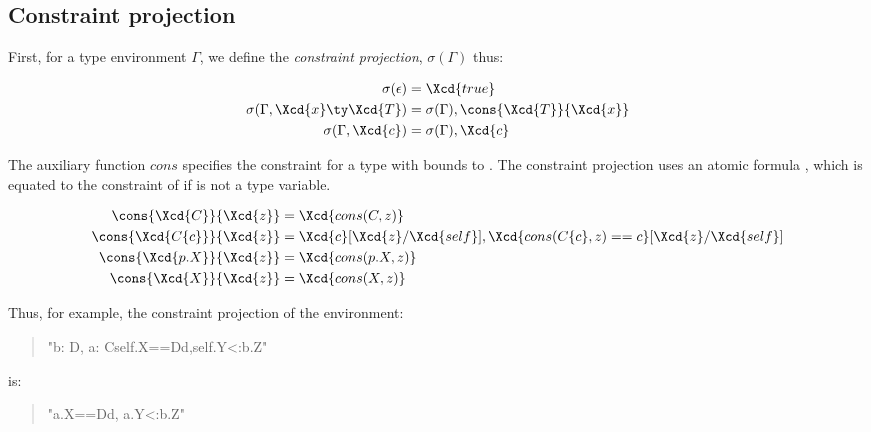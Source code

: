 \subsection{
Constraint projection
}

First, for a type environment $\Gamma$,
we define the \emph{constraint projection},
$\sigma(\Gamma)$ thus:

\begin{align*}
\sigma(\epsilon) &= \Xcd{true} \\
\sigma(\Gamma, \Xcd{x} \ty \Xcd{T}) &=
        \sigma(\Gamma),
        \cons{\Xcd{T}}{\Xcd{x}}
\\
\sigma(\Gamma, \Xcd{c}) &= \sigma(\Gamma), \Xcd{c} \\
\end{align*}

The auxiliary function $\mathit{cons}$
specifies the constraint for a type  with 
bounds to .
The constraint projection uses an atomic formula ,
which is equated to the constraint of  if  is not
a type variable.

\begin{align*}
\cons{\Xcd{C}}{\Xcd{z}} &=
    \Xcd{cons(C,z)} \\
\cons{\Xcd{C\{c\}}}{\Xcd{z}} &=
    \Xcd{c}[\Xcd{z}/\Xcd{self}], \Xcd{cons(C\{c\},z)==c}[\Xcd{z}/\Xcd{self}] \\
\cons{\Xcd{p.X}}{\Xcd{z}} &=
    \Xcd{cons(p.X,z)} \\
\cons{\Xcd{X}}{\Xcd{z}} &=
    \Xcd{cons(X,z)} \\
\end{align*}

\noindent
Thus, for example, the constraint projection of the environment:
\begin{quote}
\xcdmath"b: D, a: C{self.X==D{d},self.Y<:b.Z}"
\end{quote}
\noindent is:
\begin{quote}
\xcdmath"a.X==D{d}, a.Y<:b.Z" \\
\end{quote}

